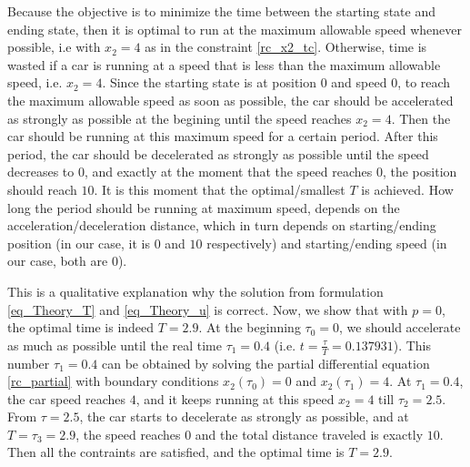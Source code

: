 \documentclass  [
  paper    = a4,
  BCOR     = 10mm,
  twoside,
  fontsize = 12pt,
  fleqn,
  toc      = bibnumbered,
  toc      = listofnumbered,
  numbers  = noendperiod,
  headings = normal,
  listof   = leveldown,
  version  = 3.03
]                                       {scrreprt}
\newcommand{\<}{\langle}
\renewcommand{\>}{\rangle}
\begin{document}
Because the objective is to minimize the time between the starting state and ending state, then it is optimal to run at the maximum allowable speed whenever possible, i.e with $x_2 =4$ as in the constraint \ref{rc_x2_tc}. Otherwise, time is wasted if a car is running at a speed that is less than the maximum allowable speed, i.e. $x_2=4$. Since the starting state is at position $0$ and speed $0$, to reach the maximum allowable speed as soon as possible, the car should be accelerated as strongly as possible at the begining until the speed reaches $x_2 =4$. Then the car should be running at this maximum speed for a certain period. After this period, the car should be decelerated as strongly as possible until the speed decreases to $0$, and exactly at the moment that the speed reaches $0$, the position should reach $10$. It is this moment that the optimal/smallest $T$ is achieved. How long the period should be running at maximum speed, depends on the acceleration/deceleration distance, which in turn depends on  starting/ending position (in our case, it is $0$ and $10$ respectively) and starting/ending speed (in our case, both are $0$). 




This is a qualitative explanation why the solution from formulation \ref{eq_Theory_T} and \ref{eq_Theory_u} is correct. Now, we show that with $p=0$, the optimal time is indeed $T=2.9$. At the beginning $\tau_0 = 0$,  we should accelerate as much as possible until the real time $\tau_1=0.4$ (i.e. $t= \frac{\tau}{T} = 0.137931$). This number $\tau_1=0.4$ can be obtained by solving the partial differential equation \ref{rc_partial} with boundary conditions $x_2(\tau_0)=0$ and $x_2(\tau_1)=4$. At $\tau_1=0.4$, the car speed reaches $4$, and it keeps running at this speed $x_2=4$ till $\tau_2=2.5$. From $\tau=2.5$, the car starts to decelerate as strongly as possible, and at $T=\tau_3=2.9$, the speed reaches $0$ and the total distance traveled is exactly $10$. Then all the contraints are satisfied, and the optimal time is $T=2.9$. 
\end{document}
